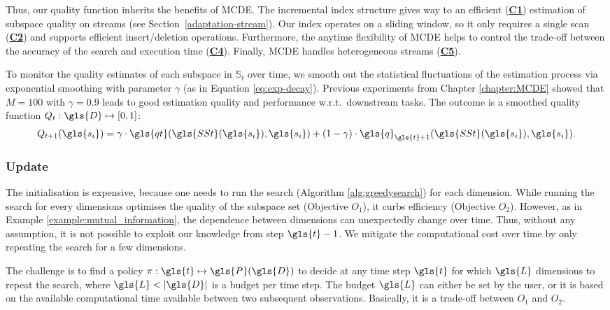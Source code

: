 Thus, our quality function inherits the benefits of \gls{MCDE}. The incremental index structure gives way to an efficient (\hyperlink{C1}{\textbf{C1}}) estimation of subspace quality on streams (see Section~\ref{adaptation-stream}). Our index operates on a sliding window, so it only requires a single scan (\hyperlink{C2}{\textbf{C2}}) and supports efficient insert/deletion operations. Furthermore, the anytime flexibility of \gls{MCDE} helps to control the trade-off between the accuracy of the search and execution time (\hyperlink{C4}{\textbf{C4}}). Finally, \gls{MCDE} handles heterogeneous streams (\hyperlink{C5}{\textbf{C5}}). 

To monitor the quality estimates of each subspace in $\mathbb{S}_t$ over time, we smooth out the statistical fluctuations of the estimation process via exponential smoothing with parameter $\gamma$ (as in Equation \ref{eq:exp-decay}). Previous experiments from Chapter \ref{chapter:MCDE} showed that $M=100$ with $\gamma = 0.9$ leads to good estimation quality and performance w.r.t.\ downstream tasks. The outcome is a smoothed quality function $Q_t: \gls{D}\mapsto [0,1]$:
\begin{align}
\label{eg:monitoring}
Q_{t+1}(\gls{s_i}) = \gamma \cdot \gls{qt}(\gls{SSt}(\gls{s_i}), \gls{s_i}) + (1- \gamma) \cdot \gls{q}_{\gls{t}+1}(\gls{SSt}(\gls{s_i}), \gls{s_i}).
\end{align}

\subsubsection{Update}
\label{sec:update}

The initialisation is expensive, because one needs to run the search (Algorithm \ref{alg:greedysearch}) for each dimension. While running the search for every dimensions optimises the quality of the subspace set (Objective $O_1$), it curbs efficiency (Objective $O_2$). However, as in Example \ref{example:mutual_information}, the dependence between dimensions can unexpectedly change over time. Thus, without any assumption, it is not possible to exploit our knowledge from step $\gls{t}-1$. We mitigate the computational cost over time by only repeating the search for a few dimensions. 

The challenge is to find a policy $\pi: \gls{t} \mapsto \gls{P}(\gls{D})$ to decide at any time step $\gls{t}$ for which $\gls{L}$ dimensions to repeat the search, where $\gls{L} < |\gls{D}|$ is a budget per time step. The budget $\gls{L}$ can either be set by the user, or it is based on the available computational time available between two subsequent observations. Basically, it is a trade-off between $O_1$ and $O_2$.

